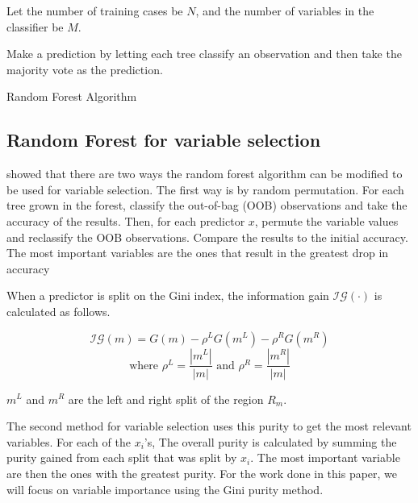 \begin{algorithm}
Let the number of training cases be $N$, and the number of variables in the classifier be $M$.

Make a prediction by letting each tree classify an observation and then take the majority vote as the prediction.
\caption{Random Forest Algorithm}\label{algo: RandomForest}
\end{algorithm}

\subsection{Random Forest for variable selection}
\citet{Breiman01} showed that there are two ways the random forest algorithm can be modified to be used for variable selection. The first way is by random permutation. For each tree grown in the forest, classify the out-of-bag (OOB) observations and take the accuracy of the results. Then, for each predictor $x$, permute the variable values and reclassify the OOB observations. Compare the results to the initial accuracy. The most important variables are the ones that result in the greatest drop in accuracy

When a predictor is split on the Gini index, the information gain $\mathcal{IG}(\cdot)$ is calculated as follows. 

\begin{equation}\label{eqn:Delta Function}
	\mathcal{IG}(m)=G(m)-\rho^L G(m^L)-\rho^R G(m^R) 
\end{equation}
\begin{equation}
	\text{where } \rho^L = \frac{|m^L|}{|m|} \text{ and } \rho^R = \frac{|m^R|}{|m|}
\end{equation}
	



$m^L$ and $m^R$ are the left and right split of the region $R_m$. 

The second method for variable selection uses this purity to get the most relevant variables. For each of the $x_i$'s, The overall purity is calculated by summing the purity gained from each split that was split by $x_i$. The most important variable are then the ones with the greatest purity. For the work done in this paper, we will focus on variable importance using the Gini purity method. 	

